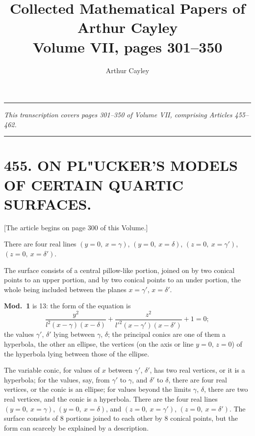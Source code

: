 \documentclass[11pt,a4paper]{article}
\title{\textbf{Collected Mathematical Papers of Arthur Cayley}\\[0.5em]
\large Volume VII, pages 301--350}
\author{Arthur Cayley}
\date{}
\newcommand{\article}[2]{\section*{#1. #2}}
\begin{document}
\maketitle
\thispagestyle{empty}

\vspace{1em}
\noindent\rule{\textwidth}{0.4pt}
\vspace{0.5em}

\noindent\textit{This transcription covers pages 301--350 of Volume VII, comprising Articles 455--462.}

\vspace{0.5em}
\noindent\rule{\textwidth}{0.4pt}

\newpage
\setcounter{page}{301}

\article{455}{ON PL"{U}CKER'S MODELS OF CERTAIN QUARTIC SURFACES.}


\vspace{0.5em}

[The article begins on page 300 of this Volume.]

\vspace{0.5em}

There are four real lines $(y=0,\ x=\gamma)$, $(y=0,\ x=\delta)$, $(z=0,\ x=\gamma')$, $(z=0,\ x=\delta')$.

The surface consists of a central pillow-like portion, joined on by two conical points to an upper portion, and by two conical points to an under portion, the whole being included between the planes $x=\gamma'$, $x=\delta'$.

\textbf{Mod.~1} is 13: the form of the equation is
\[
\frac{y^{2}}{l^{2}(x-\gamma)(x-\delta)} + \frac{z^{2}}{l'^{2}(x-\gamma')(x-\delta')} + 1 = 0;
\]
the values $\gamma'$, $\delta'$ lying between $\gamma$, $\delta$; the principal conics are one of them a hyperbola, the other an ellipse, the vertices (on the axis or line $y=0$, $z=0$) of the hyperbola lying between those of the ellipse.

The variable conic, for values of $x$ between $\gamma'$, $\delta'$, has two real vertices, or it is a hyperbola; for the values, say, from $\gamma'$ to $\gamma$, and $\delta'$ to $\delta$, there are four real vertices, or the conic is an ellipse; for values beyond the limits $\gamma$, $\delta$, there are two real vertices, and the conic is a hyperbola. There are the four real lines $(y=0,\ x=\gamma)$, $(y=0,\ x=\delta)$, and $(z=0,\ x=\gamma')$, $(z=0,\ x=\delta')$. The surface consists of 8 portions joined to each other by 8 conical points, but the form can scarcely be explained by a description.
\end{document}

